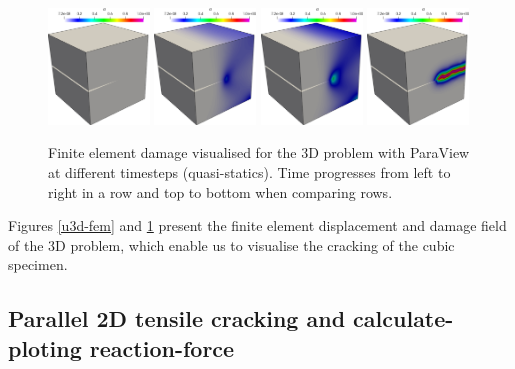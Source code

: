 {{\begin{figure}[h!]
	\centering
	
	\includegraphics[width=0.24\textwidth]{./Images/d3d0.png}
	\includegraphics[width=0.24\textwidth]{./Images/d3d1.png} 
	\includegraphics[width=0.24\textwidth]{./Images/d3d2.png}
	\includegraphics[width=0.24\textwidth]{./Images/d3d3.png}
	\caption{Finite element damage visualised for the 3D problem with ParaView at different timesteps (quasi-statics). Time progresses from left to right in a row and top to bottom when comparing rows. \label{d3d-fem}}
\end{figure}

Figures \ref{u3d-fem} and \ref{d3d-fem} present the finite element displacement and damage field of the 3D problem, which enable us to visualise the cracking of the cubic specimen.

\subsection{Parallel 2D tensile cracking and calculate-ploting reaction-force}

}}
